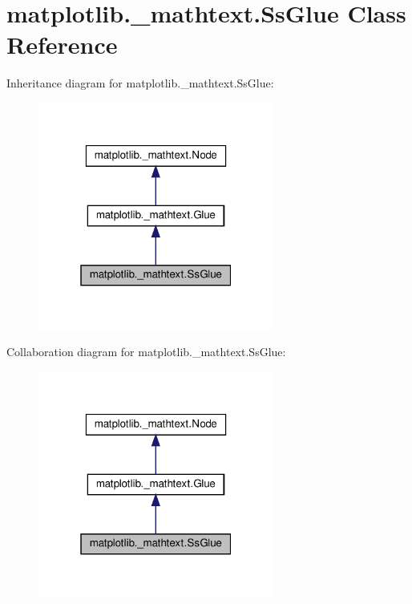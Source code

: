 \hypertarget{classmatplotlib_1_1__mathtext_1_1SsGlue}{}\section{matplotlib.\+\_\+mathtext.\+Ss\+Glue Class Reference}
\label{classmatplotlib_1_1__mathtext_1_1SsGlue}


Inheritance diagram for matplotlib.\+\_\+mathtext.\+Ss\+Glue\+:
\nopagebreak
\begin{figure}[H]
\begin{center}
\leavevmode
\includegraphics[width=220pt]{classmatplotlib_1_1__mathtext_1_1SsGlue__inherit__graph}
\end{center}
\end{figure}


Collaboration diagram for matplotlib.\+\_\+mathtext.\+Ss\+Glue\+:
\nopagebreak
\begin{figure}[H]
\begin{center}
\leavevmode
\includegraphics[width=220pt]{classmatplotlib_1_1__mathtext_1_1SsGlue__coll__graph}
\end{center}
\end{figure}
